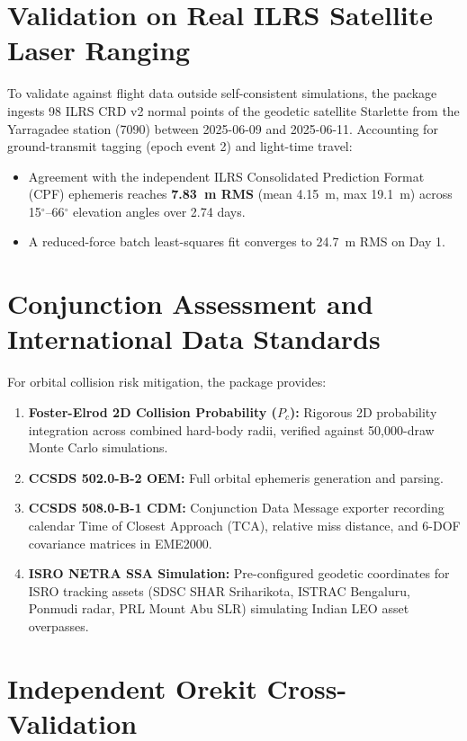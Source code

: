 \documentclass[11pt,a4paper]{article}
\begin{document}
\section{Validation on Real ILRS Satellite Laser Ranging}

To validate against flight data outside self-consistent simulations, the package ingests 98 ILRS CRD v2 normal points of the geodetic satellite Starlette from the Yarragadee station (7090) between 2025-06-09 and 2025-06-11. 
Accounting for ground-transmit tagging (epoch event 2) and light-time travel:
\begin{itemize}
    \item Agreement with the independent ILRS Consolidated Prediction Format (CPF) ephemeris reaches \textbf{7.83~m RMS} (mean 4.15~m, max 19.1~m) across 15$^\circ$--66$^\circ$ elevation angles over 2.74 days.
    \item A reduced-force batch least-squares fit converges to 24.7~m RMS on Day 1.
\end{itemize}

\section{Conjunction Assessment and International Data Standards}

For orbital collision risk mitigation, the package provides:
\begin{enumerate}
    \item \textbf{Foster-Elrod 2D Collision Probability ($P_c$):} Rigorous 2D probability integration across combined hard-body radii, verified against 50,000-draw Monte Carlo simulations.
    \item \textbf{CCSDS 502.0-B-2 OEM:} Full orbital ephemeris generation and parsing.
    \item \textbf{CCSDS 508.0-B-1 CDM:} Conjunction Data Message exporter recording calendar Time of Closest Approach (TCA), relative miss distance, and 6-DOF covariance matrices in EME2000.
    \item \textbf{ISRO NETRA SSA Simulation:} Pre-configured geodetic coordinates for ISRO tracking assets (SDSC SHAR Sriharikota, ISTRAC Bengaluru, Ponmudi radar, PRL Mount Abu SLR) simulating Indian LEO asset overpasses.
\end{enumerate}

\section{Independent Orekit Cross-Validation}
\end{document}
